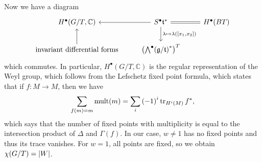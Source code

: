 \documentclass[leqno, openany]{memoir}
\theoremstyle{definition}
\theoremstyle{remark}
\theoremstyle{plain}
\theoremstyle{definition}
\theoremstyle{remark}
\newcommand{\C}{\mathbb{C}}
\newcommand{\mf}[1]{\mathfrak{#1}}
\begin{document}
Now we have a diagram
\begin{equation*}
\begin{tikzcd}
    H^{\bullet}(G/T, \C) & S^{\bullet} \mf{t}^* \ar[equal]{r} \ar{l} \ar{d}{\lambda \mapsto \lambda([x_1, x_2])} & H^{\bullet}(BT) \\
    \text{invariant differential forms} \ar{u} & {\qty({\bigwedge}^{\bullet}{(\mf{g}/\mf{t})}^*)}^T
\end{tikzcd}
\end{equation*}
which commutes. In particular, $H^{\bullet}(G/T, \C)$ is the regular representation of the Weyl group, which follows from the Lefschetz fixed point formula, which states that if $f \colon M \to M$, then we have
\[ \sum_{f(m) = m} \operatorname{mult}(m) = \sum_i {(-1)}^i \tr_{H^i(M)} f^*, \]
which says that the number of fixed points with multiplicity is equal to the intersection product of $\Delta$ and $\Gamma(f)$. In our case, $w \neq 1$ has no fixed points and thus its trace vanishes. For $w = 1$, all points are fixed, so we obtain $\chi(G/T) = \abs{W}$.
\end{document}
